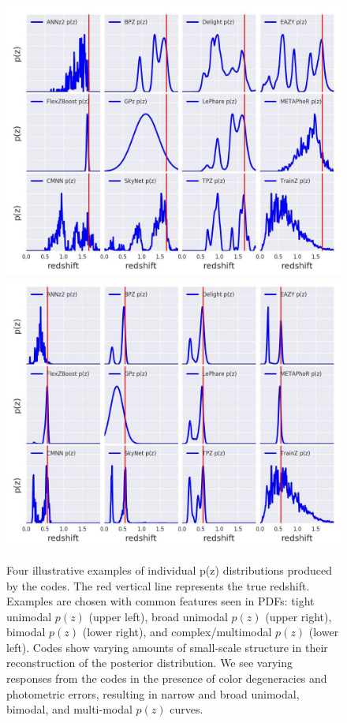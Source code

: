 \begin{figure}
\includegraphics[width=\textwidth]{fig/pz_12codes_713178_crop.jpg}\includegraphics[width=\textwidth]{fig/pz_12codes_982747_crop.jpg}
\caption{Four illustrative examples of individual p(z) distributions produced by the codes.  The red vertical line represents the true redshift.  Examples are chosen with common features seen in PDFs: tight unimodal $p(z)$ (upper left), broad unimodal $p(z)$ (upper right), bimodal $p(z)$ (lower right), and complex/multimodal $p(z)$ (lower left).  Codes show varying amounts of small-scale structure in their reconstruction of the posterior distribution.  We see varying responses from the codes in the presence of color degeneracies and photometric errors, resulting in narrow and broad unimodal, bimodal, and multi-modal $p(z)$ curves.} \label{fig:pz_examples}
\end{figure}

